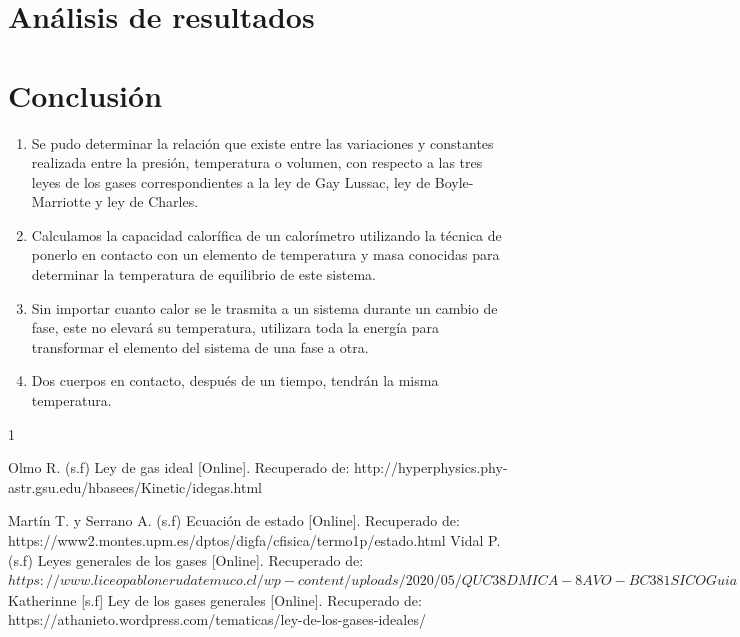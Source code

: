 \documentclass[journal,transmag]{IEEEtran}
\begin{document}
\section{Análisis de resultados}



\section{Conclusión}
	
	\begin{enumerate}[label=(\roman*)]
		\item Se pudo determinar la relación que existe entre las variaciones y constantes realizada entre la presión, temperatura o volumen, con respecto a las tres leyes de los gases correspondientes a la ley de Gay Lussac, ley de Boyle-Marriotte y ley de Charles.  
		\item  Calculamos la capacidad calorífica de un calorímetro utilizando la técnica de ponerlo en contacto con un elemento de temperatura y masa conocidas para determinar la temperatura de equilibrio de este sistema. 
		\item  Sin importar cuanto calor se le trasmita a un sistema durante un cambio de fase, este no elevará su temperatura, utilizara toda la energía para transformar el elemento del sistema de una fase a otra.
		\item Dos cuerpos en contacto, después de un tiempo, tendrán la misma temperatura.
	\end{enumerate}

\appendices


\ifCLASSOPTIONcaptionsoff
  \newpage
\fi


\begin{thebibliography}{1}


Olmo R. (s.f) Ley de gas ideal [Online]. Recuperado de: http://hyperphysics.phy-astr.gsu.edu/hbasees/Kinetic/idegas.html 

Martín T. y Serrano A. (s.f) Ecuación de estado [Online]. Recuperado de:  https://www2.montes.upm.es/dptos/digfa/cfisica/termo1p/estado.html 
Vidal P. (s.f) Leyes generales de los gases [Online]. Recuperado de:$ https://www.liceopablonerudatemuco.cl/wp-content/uploads/2020/05/QUC38DMICA-8AVO-BC381SICOGuia-leyes-de-Leyes_de_los_gases.pdf $
Katherinne [s.f] Ley de los gases generales [Online]. Recuperado de: https://athanieto.wordpress.com/tematicas/ley-de-los-gases-ideales/ 

\end{thebibliography}
\end{document}
